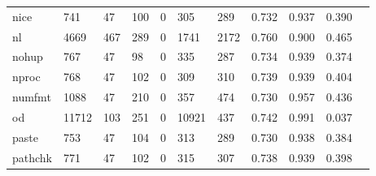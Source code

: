 \begin{longtable}{lp{1.10cm}p{1.10cm}p{1.10cm}p{1.10cm}p{1.10cm}p{1.10cm}p{1.10cm}p{1.10cm}p{1.10cm}p{1.10cm}}
nice      &                    741 &                                 47 &                               100 &                                0 &                               305 &                             289 &                          0.732 &                                 0.937 &                               0.390 \\
nl        &                   4669 &                                467 &                               289 &                                0 &                              1741 &                            2172 &                          0.760 &                                 0.900 &                               0.465 \\
nohup     &                    767 &                                 47 &                                98 &                                0 &                               335 &                             287 &                          0.734 &                                 0.939 &                               0.374 \\
nproc     &                    768 &                                 47 &                               102 &                                0 &                               309 &                             310 &                          0.739 &                                 0.939 &                               0.404 \\
numfmt    &                   1088 &                                 47 &                               210 &                                0 &                               357 &                             474 &                          0.730 &                                 0.957 &                               0.436 \\
od        &                  11712 &                                103 &                               251 &                                0 &                             10921 &                             437 &                          0.742 &                                 0.991 &                               0.037 \\
paste     &                    753 &                                 47 &                               104 &                                0 &                               313 &                             289 &                          0.730 &                                 0.938 &                               0.384 \\
pathchk   &                    771 &                                 47 &                               102 &                                0 &                               315 &                             307 &                          0.738 &                                 0.939 &                               0.398 \\

\end{longtable}
